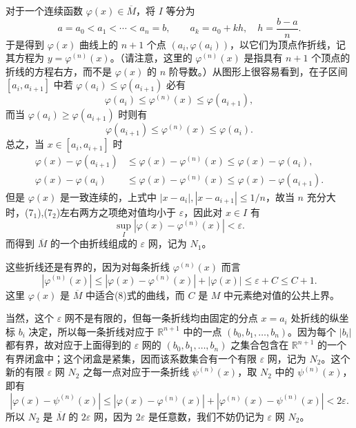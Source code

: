 对于一个连续函数 $\varphi(x)\in\overline M$，将 $I$ 等分为
\[
 a=a_0<a_1<\cdots<a_n=b,\qquad a_k=a_0+kh,\quad h=\frac{b-a}{n}.
\]
于是得到 $\varphi(x)$ 曲线上的 $n+1$ 个点 $(a_i,\varphi(a_i))$，以它们为顶点作折线，记其方程为 $y=\varphi^{(n)}(x)$。（请注意，这里的 $\varphi^{(n)}(x)$ 是指具有 $n+1$ 个顶点的折线的方程右方，而不是 $\varphi(x)$ 的 $n$ 阶导数。）从图形上很容易看到，在子区间 $[a_i,a_{i+1}]$ 中若 $\varphi(a_i)\le\varphi(a_{i+1})$ 必有
\[
 \varphi(a_i)\le\varphi^{(n)}(x)\le\varphi(a_{i+1}),
\]
而当 $\varphi(a_i)\ge\varphi(a_{i+1})$ 时则有
\[
 \varphi(a_{i+1})\le\varphi^{(n)}(x)\le\varphi(a_i).
\]
总之，当 $x\in[a_i,a_{i+1}]$ 时
\begin{align}
 \varphi(x)-\varphi(a_{i+1})&\le\varphi(x)-\varphi^{(n)}(x)\le\varphi(x)-\varphi(a_i), \tag{7$_1$}\\
 \varphi(x)-\varphi(a_i)&\le\varphi(x)-\varphi^{(n)}(x)\le\varphi(x)-\varphi(a_{i+1}). \tag{7$_2$}
\end{align}
但是 $\varphi(x)$ 是一致连续的，上式中 $|x-a_i|,|x-a_{i+1}|\le1/n$，故当 $n$ 充分大时，(7$_1$),(7$_2$)左右两方之项绝对值均小于 $\varepsilon$，因此对 $x\in I$ 有
\begin{equation}
 \sup_I|\varphi(x)-\varphi^{(n)}(x)|<\varepsilon.
 \tag{8}
\end{equation}
而得到 $\overline M$ 的一个由折线组成的 $\varepsilon$ 网，记为 $N_1$。

这些折线还是有界的，因为对每条折线 $\varphi^{(n)}(x)$ 而言
\[
 |\varphi^{(n)}(x)|\le |\varphi(x)-\varphi^{(n)}(x)|+|\varphi(x)|\le\varepsilon+C\le C+1.
\]
这里 $\varphi(x)$ 是 $\overline M$ 中适合(8)式的曲线，而 $C$ 是 $M$ 中元素绝对值的公共上界。

当然，这个 $\varepsilon$ 网不是有限的，但每一条折线均由固定的分点 $x=a_i$ 处折线的纵坐标 $b_i$ 决定，所以每一条折线对应于 $\mathbb R^{n+1}$ 中的一点 $(b_0,b_1,\ldots,b_n)$。因为每个 $|b_i|$ 都有界，故对应于上面得到的 $\varepsilon$ 网的 $(b_0,b_1,\ldots,b_n)$ 之集合包含在 $\mathbb R^{n+1}$ 的一个有界闭盒中；这个闭盒是紧集，因而该系数集合有一个有限 $\varepsilon$ 网，记为 $N_2$。这个新的有限 $\varepsilon$ 网 $N_2$ 之每一点对应于一条折线 $\psi^{(n)}(x)$，取 $N_2$ 中的 $\psi^{(n)}(x)$，即有
\[
 |\varphi(x)-\psi^{(n)}(x)|\le |\varphi(x)-\varphi^{(n)}(x)|+|\varphi^{(n)}(x)-\psi^{(n)}(x)|<2\varepsilon.
\]
所以 $N_2$ 是 $\overline M$ 的 $2\varepsilon$ 网，因为 $2\varepsilon$ 是任意数，我们不妨仍记为 $\varepsilon$ 网 $N_2$。

